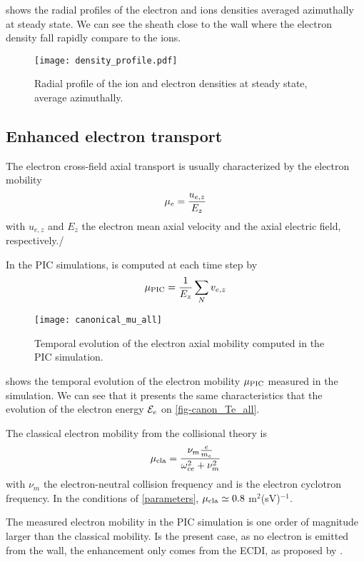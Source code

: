    shows the radial profiles of the electron and ions densities averaged azimuthally at steady state.
  We can see the sheath close to the wall where the electron density fall rapidly compare to the ions.
  
  \begin{figure}[hbtp]
    \centering
    \texttt{[image: density\_profile.pdf]}
    \caption{Radial profile of the ion and electron densities at steady state, average azimuthally.}
    \label{fig-profiles}
  \end{figure}
  
  \subsection{Enhanced electron transport} \label{subsec-canonmue}
  The electron cross-field axial transport is usually characterized by the electron mobility
  \begin{equation} \label{eq-mobdef}
    \mu_e = \frac{u_{e, z}}{E_z}
  \end{equation}
  with $u_{e,z}$ and $E_z$ the electron mean axial velocity and the axial electric field, respectively./
  
  In the \ac{PIC} simulations, \mob is computed at each time step by
  \begin{equation} \label{eq-mobpic}
    \mu_{\mathrm{PIC}} = \frac{1}{E_z} \sum_N v_{e,z}
  \end{equation}

  \begin{figure}[hbtp]
    \centering
    \texttt{[image: canonical\_mu\_all]}
    \caption{Temporal evolution of the electron axial mobility computed in the \ac{PIC} simulation.}
    \label{fig-canon_mu}
  \end{figure}
  
   shows the temporal evolution of the electron mobility $\mu_{\mathrm{PIC}}$ measured in the simulation.
  We can see that it presents the same characteristics that the evolution of the electron energy ${\mathcal{E}_e}$ on \cref{fig-canon_Te_all}.
  
  The classical electron mobility from the collisional theory is \citep{lafleur2016a}
  \begin{equation} \label{eq-muclass}
    \mu_{\rm cla} = \frac{\nu_m \frac{e}{m_e}}{\omega_{ce}^2 + \nu_m^2}
  \end{equation}
  with $\nu_m$ the electron-neutral  collision frequency and \oce is the electron cyclotron frequency.
  In the conditions of \cref{parameters}, $\mu_{\rm cla} \simeq 0.8$ m$^2$(sV)$^{-1}$.
  
  The measured electron mobility in the \ac{PIC} simulation is one order of magnitude larger than the classical mobility.
  Is the present case, as no electron is emitted from the wall, the enhancement only comes from the \ac{ECDI}, as proposed by \citet{lafleur2016} .
  
  
  
  
  